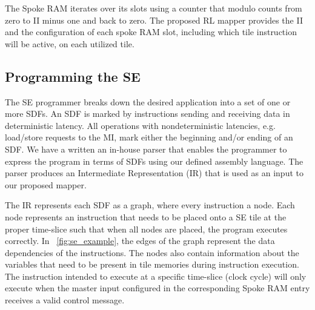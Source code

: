 The Spoke RAM iterates over its slots using a counter that modulo counts from zero to II minus one and back to zero.
The proposed RL mapper provides the II and the configuration of each spoke RAM slot, including which tile instruction will be active, on each utilized tile.

\subsection{Programming the SE}
The SE programmer breaks down the desired application into a set of one or more SDFs.
An SDF is marked by instructions sending and receiving data in deterministic latency.
All operations with nondeterministic latencies, e.g. load/store requests to the MI, mark either the beginning and/or ending of an SDF.
We have a written an in-house parser that enables the programmer to express the program in terms of SDFs using our defined assembly language.
The parser produces an Intermediate Representation (IR) that is used as an input to our proposed mapper.

The IR represents each SDF as a graph, where every instruction a node.
Each node represents an instruction that needs to be placed onto a SE tile at the proper time-slice such that when all nodes are placed, the program executes correctly. 
In \figurename~\ref{fig:se_example}, the edges of the graph represent the data dependencies of the instructions. 
The nodes also contain information about the variables that need to be present in tile memories during instruction execution. 
The instruction intended to execute at a specific time-slice (clock cycle) will only execute when the master input configured in the corresponding Spoke RAM entry receives a valid control message.


